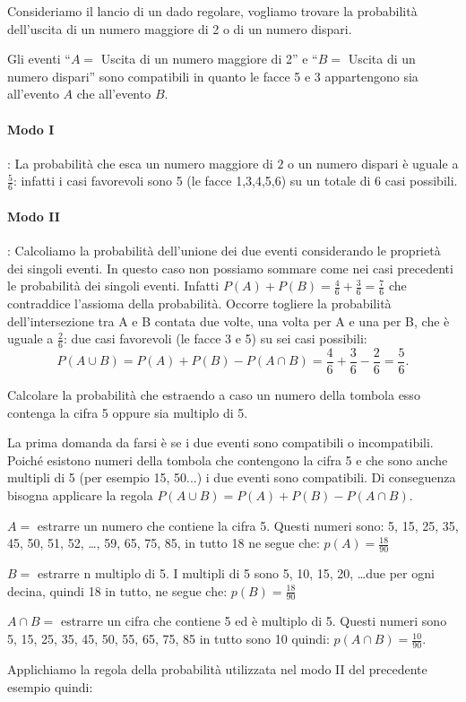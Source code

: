 \begin{exrig}
\begin{esempio}
Consideriamo il lancio di un dado regolare, vogliamo trovare la probabilità 
dell'uscita di un numero maggiore di 2 o di un numero dispari.

Gli eventi ``$ A= $ Uscita di un numero maggiore di 2'' e ``$ B= $ Uscita di un 
numero dispari'' sono compatibili in quanto le facce 5 e 3 appartengono sia 
all'evento $A$ che all'evento $B$.

\paragraph{Modo I}: La probabilità che esca un numero maggiore di $2$ o un 
numero dispari è uguale a $\frac 5 6$: infatti i casi favorevoli sono 5 (le 
facce 1,3,4,5,6) su un totale di $6$ casi possibili.
\paragraph{Modo II}: Calcoliamo la probabilità dell'unione dei due eventi 
considerando le proprietà dei singoli eventi. In questo caso non possiamo 
sommare come nei casi precedenti le probabilità dei singoli eventi. Infatti 
$P(A)+P(B)=\frac 4 6+\frac 3 6=\frac 7 6$ che contraddice l'assioma della 
probabilità. Occorre togliere la probabilità dell'intersezione tra A e B 
contata 
due volte, una volta per A e una per B, che è uguale a $\frac 2 6$: due casi 
favorevoli (le facce 3 e 5) su sei casi possibili: \[P(A\cup 
B)=P(A)+P(B)-P(A\cap B)=\frac 4 6+\frac 3 6-\frac 2 6=\frac 5 6.\]
\end{esempio}

\begin{esempio}
Calcolare la probabilità che estraendo a caso un numero della tombola esso 
contenga la cifra 5 oppure sia multiplo di 5.

La prima domanda da farsi è se i due eventi sono compatibili o incompatibili. 
Poiché esistono numeri della tombola che contengono la cifra 5 e che sono anche 
multipli di 5 (per esempio 15, 50...) i due eventi sono compatibili. Di 
conseguenza bisogna applicare la regola $P(A\cup B)=P(A)+P(B)-P(A\cap B)$.
\begin{itemize*}
\item $ A = $ estrarre un numero che contiene la cifra 5. Questi numeri sono: 
5, 
15, 25, 35, 45, 50, 51, 52, \dots, 59, 65, 75, 85, in tutto 18 ne segue che: 
$p(A)=\frac{18}{90}$
\item $ B = $ estrarre n multiplo di 5. I multipli di 5 sono 5, 10, 15, 20, 
\dots due per ogni decina, quindi 18 in tutto, ne segue che: 
$p(B)=\frac{18}{90}$
\item $A\cap B =$ estrarre un cifra che contiene 5 ed è multiplo di 5. Questi 
numeri sono 5, 15, 25, 35, 45, 50, 55, 65, 75, 85 in tutto sono 10 quindi: 
$p(A\cap B)=\frac{10}{90}$.
\end{itemize*}
Applichiamo la regola della probabilità utilizzata nel modo II del precedente 
esempio quindi:


\end{esempio}
\end{exrig}

